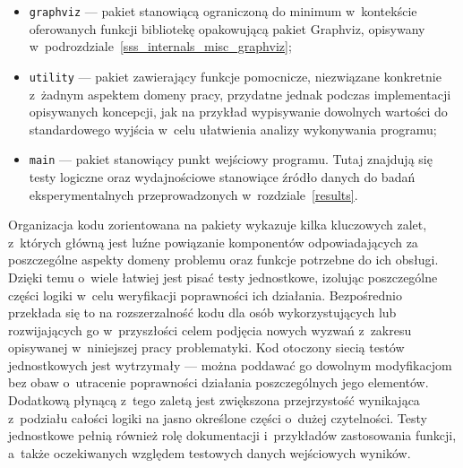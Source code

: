 {\begin{itemize}
    \item \texttt{graphviz} --- pakiet stanowiącą ograniczoną do minimum w~kontekście oferowanych funkcji bibliotekę opakowującą pakiet Graphviz, opisywany w~podrozdziale~\ref{sss_internals_misc_graphviz};
    \item \texttt{utility} --- pakiet zawierający funkcje pomocnicze, niezwiązane konkretnie z~żadnym aspektem domeny pracy, przydatne jednak podczas implementacji opisywanych koncepcji, jak na przykład wypisywanie dowolnych wartości do standardowego wyjścia w~celu ułatwienia analizy wykonywania programu;
    \item \texttt{main} --- pakiet stanowiący punkt wejściowy programu. Tutaj znajdują się testy logiczne oraz wydajnościowe stanowiące źródło danych do badań eksperymentalnych przeprowadzonych w~rozdziale~\ref{results}.
  \end{itemize}
}
\par{
  Organizacja kodu zorientowana na pakiety wykazuje kilka kluczowych zalet, z~których główną jest luźne powiązanie komponentów odpowiadających za poszczególne aspekty domeny problemu oraz funkcje potrzebne do ich obsługi.
  Dzięki temu o~wiele łatwiej jest pisać testy jednostkowe, izolując poszczególne części logiki w~celu weryfikacji poprawności ich działania. 
  Bezpośrednio przekłada się to na rozszerzalność kodu dla osób wykorzystujących lub rozwijających go w~przyszłości celem podjęcia nowych wyzwań z~zakresu opisywanej w~niniejszej pracy problematyki.
  Kod otoczony siecią testów jednostkowych jest wytrzymały --- można poddawać go dowolnym modyfikacjom bez obaw o~utracenie poprawności działania poszczególnych jego elementów.
  Dodatkową płynącą z~tego zaletą jest zwiększona przejrzystość wynikająca z~podziału całości logiki na jasno określone części o~dużej czytelności.
  Testy jednostkowe pełnią również rolę dokumentacji i~przykładów zastosowania funkcji, a~także oczekiwanych względem testowych danych wejściowych wyników.
}